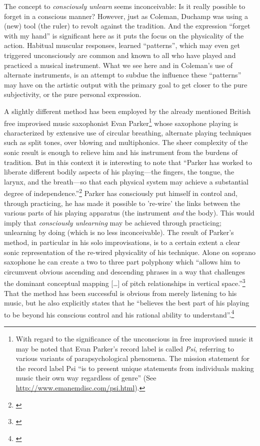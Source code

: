 The concept to \emph{consciously unlearn} seems inconceivable: Is
it really possible to forget in a conscious manner? However, just as
Coleman, Duchamp was using a (new) tool (the ruler) to revolt against
the tradition. And the expression ``forget with my hand'' is
significant here as it puts the focus on the physicality of the
action. Habitual muscular responses, learned ``patterns'', which may
even get triggered unconsciously are common and known to all who have
played and practiced a musical instrument. What we see here and in
Coleman's use of alternate instruments, is an attempt to subdue the
influence these ``patterns'' may have on the artistic output with the
primary goal to get closer to the pure subjectivity, or the pure
personal expression. 

A slightly different method has been employed by the already mentioned
British free improvised music saxophonist Evan Parker\footnote{With
  regard to the significance of the unconscious in free improvised
  music it may be noted that Evan Parker's record label is called
  \emph{Psi}, referring to various variants of
  parapsychological phenomena. The mission statement for the record
  label Psi ``is to present unique statements from individuals making
  music their own way regardless of genre'' (See
  \url{http://www.emanemdisc.com/psi.html}).} whose saxophone playing
is characterized by extensive use of circular breathing, alternate
playing techniques such as split tones, over blowing and
multiphonics. The sheer complexity of the sonic result is enough to
relieve him and his instrument from the burdens of tradition. But in
this context it is interesting to note that ``Parker has worked to
liberate different bodily aspects of his playing---the fingers, the
tongue, the larynx, and the breath---so that each physical system may
achieve a substantial degree of independence.''\footnote{\citet[p. 49]{borgo05}}
Parker has consciously put himself in control and, through practicing,
he has made it possible to 're-wire' the links between the various
parts of his playing apparatus (the instrument \emph{and} the
body). This would imply that \emph{consciously unlearning} may be
achieved through practicing; unlearning by doing (which is no less
inconceivable). The result of Parker's method, in particular in his
solo improvisations, is to a certain extent a clear sonic
representation of the re-wired physicality of his technique. Alone on
soprano saxophone he can create a two to three part polyphony which
``allows him to circumvent obvious ascending and descending phrases in
a way that challenges the dominant conceptual mapping [\ldots] of
pitch relationships in vertical space.''\footnote{\citet[p. 50]{borgo05}} That
the method has been successful is obvious from merely listening to his
music, but he also explicitly states that he ``believes the best part
of his playing to be beyond his conscious control and his rational
ability to understand''.\footnote{\citet[p. 52]{borgo05}}


